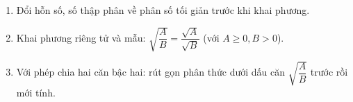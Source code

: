 \begin{enumerate}
\item Đổi hỗn số, số thập phân về phân số tối giản trước khi khai phương.
\item Khai phương riêng tử và mẫu: $\sqrt{\dfrac{A}{B}} = \dfrac{\sqrt{A}}{\sqrt{B}}$ (với $A \ge 0, B > 0$).
\item Với phép chia hai căn bậc hai: rút gọn phân thức dưới dấu căn $\sqrt{\dfrac{A}{B}}$ trước rồi mới tính.
\end{enumerate}
